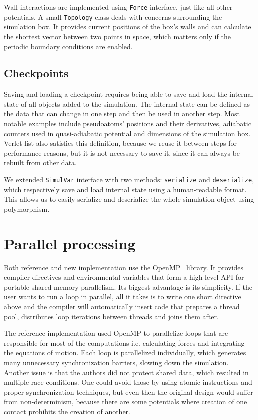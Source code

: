 Wall interactions are implemented using \texttt{Force} interface, just like all other potentials. A small \texttt{Topology} class deals with concerns surrounding the simulation box. It provides current positions of the box's walls and can calculate the shortest vector between two points in space, which matters only if the periodic boundary conditions are enabled.

\subsection{Checkpoints}

Saving and loading a checkpoint requires being able to save and load the internal state of all objects added to the simulation. The internal state can be defined as the data that can change in one step and then be used in another step. Most notable examples include pseudoatoms' positions and their derivatives, adiabatic counters used in quasi-adiabatic potential and dimensions of the simulation box. Verlet list also satisfies this definition, because we reuse it between steps for performance reasons, but it is not necessary to save it, since it can always be rebuilt from other data. 

We extended \texttt{SimulVar} interface with two methods: \texttt{serialize} and \texttt{deserialize}, which respectively save and load internal state using a human-readable format. This allows us to easily serialize and deserialize the whole simulation object using polymorphism.

\section{Parallel processing}\label{new:parallel}

Both reference and new implementation use the OpenMP~\cite{openmp} library. It provides compiler directives and environmental variables that form a high-level API for portable shared memory parallelism. Its biggest advantage is its simplicity. If the user wants to run a loop in parallel, all it takes is to write one short directive above and the compiler will automatically insert code that prepares a thread pool, distributes loop iterations between threads and joins them after. 

The reference implementation used OpenMP to parallelize loops that are responsible for most of the computations i.e. calculating forces and integrating the equations of motion. Each loop is parallelized individually, which generates many unnecessary synchronization barriers, slowing down the simulation.
Another issue is that the authors did not protect shared data, which resulted in multiple race conditions. One could avoid those by using atomic instructions and proper synchronization techniques, but even then the original design would suffer from non-determinism, because there are some potentials where creation of one contact prohibits the creation of another. 

